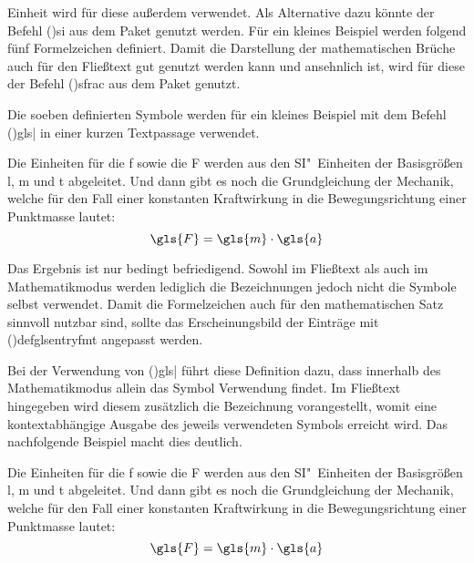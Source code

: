 \documentclass[%
  english,ngerman,%
  cdgeometry=no,DIV=12,%
  cd=false,cdfont=false,cdtitle=true,%
  headings=normal,%
  automark,%
  listof=toc,%
]{tudscrartcl}
\begin{document}
Einheit wird für diese außerdem  verwendet. Als Alternative dazu 
könnte der Befehl \Macro(){si} aus dem Paket  
genutzt werden. Für ein kleines Beispiel werden folgend fünf Formelzeichen 
definiert. Damit die Darstellung der mathematischen Brüche auch für den 
Fließtext gut genutzt werden kann und ansehnlich ist, wird für diese der Befehl 
\Macro(){sfrac} aus dem Paket  genutzt.
%
\CodeHook{\renewcommand*\newglossaryentry[2]{}}
\begin{Trunk*}

\end{Trunk*}
%
Die soeben definierten Symbole werden für ein kleines Beispiel mit dem Befehl 
\Macro(){gls|} in einer kurzen 
Textpassage verwendet.
%
\begin{Hint*}
Die Einheiten für die \gls{f} sowie die \gls{F} werden aus den 
SI"~Einheiten der Basisgrößen \gls{l}, \gls{m} und \gls{t} abgeleitet.
Und dann gibt es noch die Grundgleichung der Mechanik, welche für den
Fall einer konstanten Kraftwirkung in die Bewegungsrichtung einer
Punktmasse lautet:
\[\gls{F} = \gls{m} \cdot \gls{a}\]
\end{Hint*}
%
Das Ergebnis ist nur bedingt befriedigend. Sowohl im Fließtext als auch im 
Mathematikmodus werden lediglich die Bezeichnungen jedoch nicht die Symbole 
selbst verwendet. Damit die Formelzeichen auch für den mathematischen Satz 
sinnvoll nutzbar sind, sollte das Erscheinungsbild der Einträge mit 
\Macro(){defglsentryfmt} angepasst werden.
%
\begin{Preamble*}
\end{Preamble*}
%
Bei der Verwendung von \Macro(){gls|} 
führt diese Definition dazu, dass innerhalb des Mathematikmodus allein das 
Symbol Verwendung findet. Im Fließtext hingegeben wird diesem zusätzlich die 
Bezeichnung vorangestellt, womit eine kontextabhängige Ausgabe des jeweils 
verwendeten Symbols erreicht wird. Das nachfolgende Beispiel macht dies 
deutlich.
%
\begin{Trunk*}
Die Einheiten für die \gls{f} sowie die \gls{F} werden aus den
SI"~Einheiten der Basisgrößen \gls{l}, \gls{m} und \gls{t} abgeleitet.
Und dann gibt es noch die Grundgleichung der Mechanik, welche für den
Fall einer konstanten Kraftwirkung in die Bewegungsrichtung einer
Punktmasse lautet:
\[\gls{F} = \gls{m} \cdot \gls{a}\]

\end{Trunk*}
\end{document}
